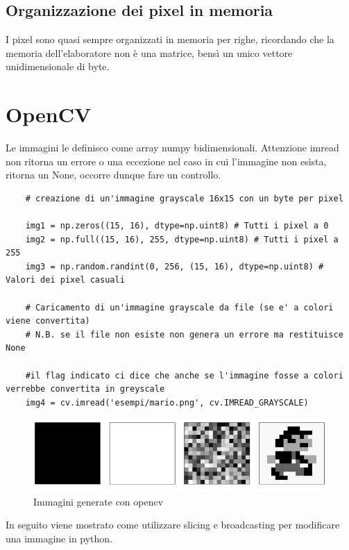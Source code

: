 \subsection{Organizzazione dei pixel in memoria}

I pixel sono quasi sempre organizzati in memoria per righe, ricordando che la memoria dell'elaboratore non è una matrice, bensì un unico vettore unidimensionale di byte.

\section{OpenCV}

Le immagini le definisco come array numpy bidimensionali. Attenzione imread non ritorna un errore o una eccezione nel caso in cui l'immagine non esista, ritorna un None, occorre dunque fare un controllo.

\begin{lstlisting}
	# creazione di un'immagine grayscale 16x15 con un byte per pixel
	
	img1 = np.zeros((15, 16), dtype=np.uint8) # Tutti i pixel a 0
	img2 = np.full((15, 16), 255, dtype=np.uint8) # Tutti i pixel a 255
	img3 = np.random.randint(0, 256, (15, 16), dtype=np.uint8) # Valori dei pixel casuali
	
	# Caricamento di un'immagine grayscale da file (se e' a colori viene convertita)
	# N.B. se il file non esiste non genera un errore ma restituisce None
	
	#il flag indicato ci dice che anche se l'immagine fosse a colori verrebbe convertita in greyscale
	img4 = cv.imread('esempi/mario.png', cv.IMREAD_GRAYSCALE)
\end{lstlisting}

\begin{figure}[htp]
	\includegraphics[width=500pt]{./immagini/opencv_images.png}
	\caption{Immagini generate con opencv}
	\label{img:opencv_images}
\end{figure}

\newpage

In seguito viene mostrato come utilizzare slicing e broadcasting per modificare una immagine in python.

